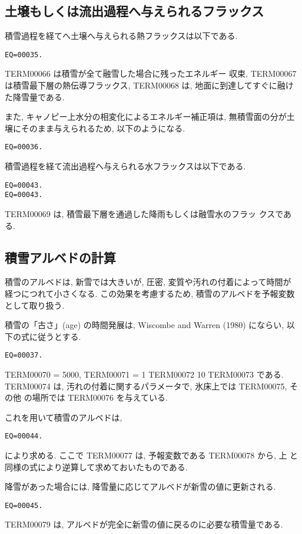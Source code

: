 \subsection{土壌もしくは流出過程へ与えられるフラックス}

積雪過程を経てへ土壌へ与えられる熱フラックスは以下である.
\begin{verbatim}
EQ=00035.
\end{verbatim}
TERM00066 は積雪が全て融雪した場合に残ったエネルギー
収束, TERM00067 は積雪最下層の熱伝導フラックス,
TERM00068 は, 地面に到達してすぐに融けた降雪量である.

また, キャノピー上水分の相変化によるエネルギー補正項は, 無積雪面の分が土
壌にそのまま与えられるため, 以下のようになる.
\begin{verbatim}
EQ=00036.
\end{verbatim}

積雪過程を経て流出過程へ与えられる水フラックスは以下である.
\begin{verbatim}
EQ=00043.
EQ=00043.
\end{verbatim}
TERM00069 は, 積雪最下層を通過した降雨もしくは融雪水のフラッ
クスである.

\subsection{積雪アルベドの計算}

積雪のアルベドは, 新雪では大きいが, 圧密, 変質や汚れの付着によって時間が
経つにつれて小さくなる. この効果を考慮するため, 積雪のアルベドを予報変数
として取り扱う.

積雪の「古さ」(age) の時間発展は, Wiscombe and Warren (1980) にならい,
以下の式に従うとする.
\begin{verbatim}
EQ=00037.
\end{verbatim}
TERM00070 = 5000, TERM00071 = 1 TERM00072 10 TERM00073 である.
TERM00074 は, 汚れの付着に関するパラメータで, 氷床上では TERM00075, その他
の場所では TERM00076 を与えている.

これを用いて積雪のアルベドは,
\begin{verbatim}
EQ=00044.
\end{verbatim}
により求める.
ここで TERM00077 は, 予報変数である TERM00078 から, 上
と同様の式により逆算して求めておいたものである.

降雪があった場合には, 降雪量に応じてアルベドが新雪の値に更新される.
\begin{verbatim}
EQ=00045.
\end{verbatim}
TERM00079 は, アルベドが完全に新雪の値に戻るのに必要な積雪量である. 
